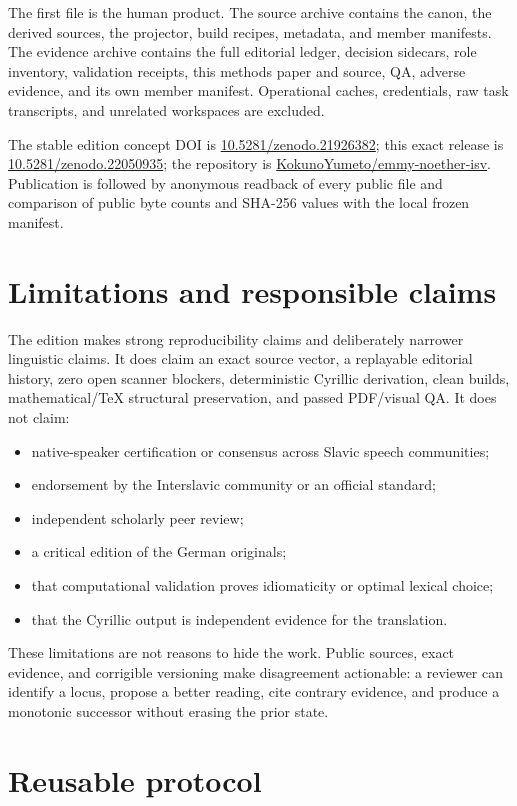 \documentclass[11pt]{article}
\newcommand{\doiurl}[1]{\href{https://doi.org/#1}{#1}}
\newcommand{\repo}{\href{https://github.com/KokunoYumeto/emmy-noether-isv}{KokunoYumeto/emmy-noether-isv}}
\begin{document}
The first file is the human product. The source archive contains the canon, the derived sources, the projector, build recipes, metadata, and member manifests. The evidence archive contains the full editorial ledger, decision sidecars, role inventory, validation receipts, this methods paper and source, QA, adverse evidence, and its own member manifest. Operational caches, credentials, raw task transcripts, and unrelated workspaces are excluded.

The stable edition concept DOI is \doiurl{10.5281/zenodo.21926382}; this exact release is \doiurl{10.5281/zenodo.22050935}; the repository is \repo. Publication is followed by anonymous readback of every public file and comparison of public byte counts and SHA-256 values with the local frozen manifest.

\section{Limitations and responsible claims}

The edition makes strong reproducibility claims and deliberately narrower linguistic claims. It does claim an exact source vector, a replayable editorial history, zero open scanner blockers, deterministic Cyrillic derivation, clean builds, mathematical/TeX structural preservation, and passed PDF/visual QA. It does not claim:

\begin{itemize}
\item native-speaker certification or consensus across Slavic speech communities;
\item endorsement by the Interslavic community or an official standard;
\item independent scholarly peer review;
\item a critical edition of the German originals;
\item that computational validation proves idiomaticity or optimal lexical choice;
\item that the Cyrillic output is independent evidence for the translation.
\end{itemize}

These limitations are not reasons to hide the work. Public sources, exact evidence, and corrigible versioning make disagreement actionable: a reviewer can identify a locus, propose a better reading, cite contrary evidence, and produce a monotonic successor without erasing the prior state.

\section{Reusable protocol}
\end{document}
